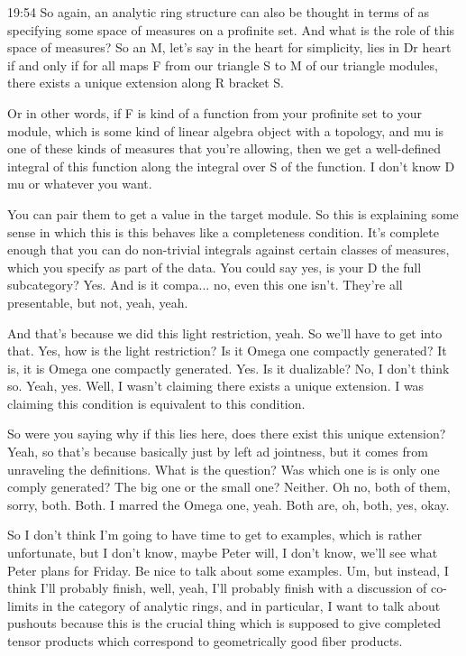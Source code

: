 \begin{unfinished}{19:54}
So again, an analytic ring structure can also be thought in terms of as specifying some space of measures on a profinite set. And what is the role of this space of measures? So an M, let's say in the heart for simplicity, lies in Dr heart if and only if for all maps F from our triangle S to M of our triangle modules, there exists a unique extension along R bracket S. 

Or in other words, if F is kind of a function from your profinite set to your module, which is some kind of linear algebra object with a topology, and mu is one of these kinds of measures that you're allowing, then we get a well-defined integral of this function along the integral over S of the function. I don't know D mu or whatever you want. 

You can pair them to get a value in the target module. So this is explaining some sense in which this is this behaves like a completeness condition. It's complete enough that you can do non-trivial integrals against certain classes of measures, which you specify as part of the data. You could say yes, is your D the full subcategory? Yes. And is it compa... no, even this one isn't. They're all presentable, but not, yeah, yeah. 

And that's because we did this light restriction, yeah. So we'll have to get into that. Yes, how is the light restriction? Is it Omega one compactly generated? It is, it is Omega one compactly generated. Yes. Is it dualizable? No, I don't think so. Yeah, yes. Well, I wasn't claiming there exists a unique extension. I was claiming this condition is equivalent to this condition. 

So were you saying why if this lies here, does there exist this unique extension? Yeah, so that's because basically just by left ad jointness, but it comes from unraveling the definitions. What is the question? Was which one is is only one comply generated? The big one or the small one? Neither. Oh no, both of them, sorry, both. Both. I marred the Omega one, yeah. Both are, oh, both, yes, okay. 

So I don't think I'm going to have time to get to examples, which is rather unfortunate, but I don't know, maybe Peter will, I don't know, we'll see what Peter plans for Friday. Be nice to talk about some examples. Um, but instead, I think I'll probably finish, well, yeah, I'll probably finish with a discussion of co-limits in the category of analytic rings, and in particular, I want to talk about pushouts because this is the crucial thing which is supposed to give completed tensor products which correspond to geometrically good fiber products. 


\end{unfinished}
